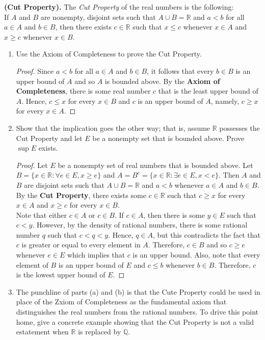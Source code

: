 \documentclass[12pt]{article}
\newcommand{\R}{\mathbb{R}}
\newcommand{\Q}{\mathbb{Q}}
\newenvironment{problem}[2][Problem]{\begin{trivlist}
		\item[\hskip \labelsep {\bfseries #1}\hskip \labelsep {\bfseries #2.}]}{\end{trivlist}}
\begin{document}
		\begin{problem}{1.3.10}
			\textbf{(Cut Property).} The \textit{Cut Property} of the real numbers is the following:\\
			If $A$ and $B$ are nonempty, disjoint sets such that $A\cup B =\R$ and $a<b$ for all $a\in A$ and $b\in B$, then there exists $c\in \R$ such that $x\leq c$ whenever $x\in A$ and $x\geq c$ whenever $x\in B$.
			\begin{enumerate}[label=(\alph*)]
				\item Use the Axiom of Completeness to prove the Cut Property.
				\begin{proof}
					Since $a<b$ for all $a\in A$ and $b\in B$, it follows that every $b\in B$ is an upper bound of $A$ and so $A$ is bounded above. By the \textbf{Axiom of Completeness}, there is some real number $c$ that is the least upper bound of $A$. Hence, $c\leq x$ for every $x\in B$ and $c$ is an upper bound of $A$, namely,  $c\geq x$ for every $x\in A$.
				\end{proof}
				\item Show that the implication goes the other way; that is, assume $\R$ possesses the Cut Property and let $E$ be a nonempty set that is bounded above. Prove $\sup E$ exists.
				\begin{proof}
					Let $E$ be a nonempty set of real numbers that is bounded above. Let $B = \{x\in \R: \forall e\in E, x \geq e\}$ and $A=B^{c} = \{x\in \R:\exists e\in E, x < e \}$. Then $A$ and $B$ are disjoint sets such that $A\cup B = \R$ and $a<b$ whenever $a\in A$ and $b\in B$. By the \textbf{Cut Property}, there exists some $c\in \R$ such that $c\geq x$ for every $x\in A$ and $x\geq c$ for every $x\in B$. \\
					
					Note that either $c\in A$ or $c\in B$. If $c\in A$, then there is some $y\in E$ such that $c<y$. However, by the density of rational numbers, there is some rational number $q$ such that $c<q<y$. Hence, $q\in A$, but this contradicts the fact that $c$ is greater or equal to every element in $A$. Therefore, $c\in B$ and so $c\geq e$  whenever $e\in E$ which implies that $c$ is an upper bound. Also, note that every element of $B$ is an upper bound of $E$ and $c\leq b$ whenever $b\in B$. Therefore, $c$ is the lowest upper bound of $E$. 
				\end{proof}
				\item The punchline of parts (a) and (b) is that the Cute Property could be used in place of the Zxiom of Completeness as the fundamental axiom that distinguishes the real numbers from the rational numbers. To drive this point home, give a concrete example showing that the Cut Property is not a valid estatement when $\R$ is replaced by $\Q$.
			\end{enumerate}
		\end{problem}
\end{document}
